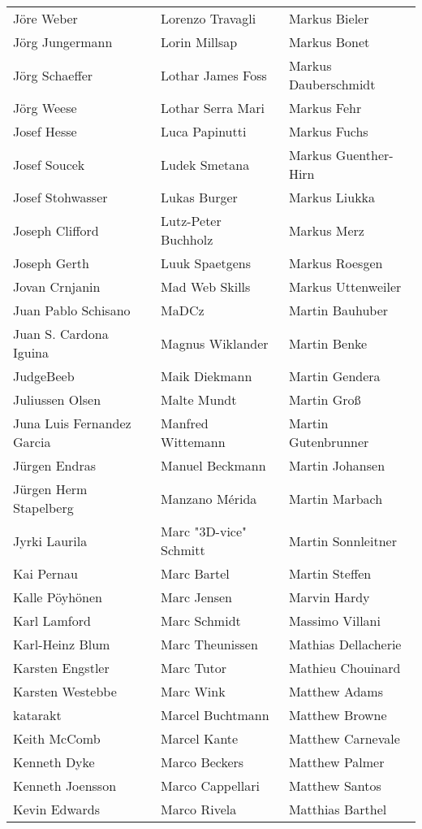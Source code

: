 \begin{small}
\begin{tabular}{p{4cm}p{4cm}p{4cm}}
Jöre Weber & Lorenzo Travagli & Markus Bieler \\
Jörg Jungermann & Lorin Millsap & Markus Bonet \\
Jörg Schaeffer & Lothar James Foss & Markus Dauberschmidt \\
Jörg Weese & Lothar Serra Mari & Markus Fehr \\
Josef Hesse & Luca Papinutti & Markus Fuchs \\
Josef Soucek & Ludek Smetana & Markus Guenther-Hirn \\
Josef Stohwasser & Lukas Burger & Markus Liukka \\
Joseph Clifford & Lutz-Peter Buchholz & Markus Merz \\
Joseph Gerth & Luuk Spaetgens & Markus Roesgen \\
Jovan Crnjanin & Mad Web Skills & Markus Uttenweiler \\
Juan Pablo Schisano & MaDCz & Martin Bauhuber \\
Juan S. Cardona Iguina & Magnus Wiklander & Martin Benke \\
JudgeBeeb & Maik Diekmann & Martin Gendera \\
Juliussen Olsen & Malte Mundt & Martin Groß \\
Juna Luis Fernandez Garcia & Manfred Wittemann & Martin Gutenbrunner \\
Jürgen Endras & Manuel Beckmann & Martin Johansen \\
Jürgen Herm Stapelberg & Manzano Mérida & Martin Marbach \\
Jyrki Laurila & Marc "3D-vice" Schmitt & Martin Sonnleitner \\
Kai Pernau & Marc Bartel & Martin Steffen \\
Kalle Pöyhönen & Marc Jensen & Marvin Hardy \\
Karl Lamford & Marc Schmidt & Massimo Villani \\
Karl-Heinz Blum & Marc Theunissen & Mathias Dellacherie \\
Karsten Engstler & Marc Tutor & Mathieu Chouinard \\
Karsten Westebbe & Marc Wink & Matthew Adams \\
katarakt & Marcel Buchtmann & Matthew Browne \\
Keith McComb & Marcel Kante & Matthew Carnevale \\
Kenneth Dyke & Marco Beckers & Matthew Palmer \\
Kenneth Joensson & Marco Cappellari & Matthew Santos \\
Kevin Edwards & Marco Rivela & Matthias Barthel \\

\end{tabular}
\end{small}
